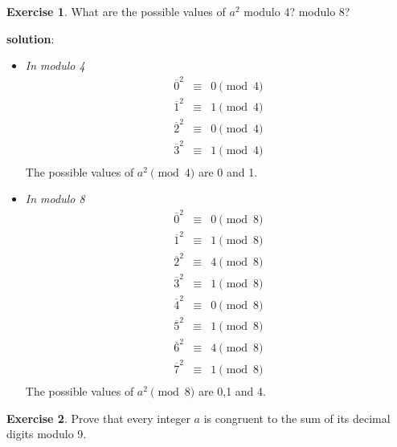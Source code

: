 \documentclass[
]{book}
\theoremstyle{definition}
\theoremstyle{definition}
\theoremstyle{definition}
\newtheorem{exercise}{Exercise}[chapter]
\theoremstyle{definition}
\theoremstyle{remark}
\begin{document}
\begin{exercise}
\protect\hypertarget{exr:unnamed-chunk-139}{}\label{exr:unnamed-chunk-139}What are the possible values of \(a^2\) modulo 4? modulo 8?
\end{exercise}

\textbf{solution}:

\begin{itemize}
\item
  \emph{In modulo 4}\\
  \begin{eqnarray*}
    \overline{0}^2&\equiv & 0 \pmod{4}\\
    \overline{1}^2&\equiv & 1 \pmod{4}\\
    \overline{2}^2&\equiv & 0 \pmod{4}\\
    \overline{3}^2&\equiv & 1 \pmod{4}\\
  \end{eqnarray*}
  The possible values of \(a^2\pmod{4}\) are 0 and 1.
\item
  \emph{In modulo 8}\\
  \begin{eqnarray*}
    \overline{0}^2&\equiv & 0 \pmod{8}\\
    \overline{1}^2&\equiv & 1 \pmod{8}\\
    \overline{2}^2&\equiv & 4 \pmod{8}\\
    \overline{3}^2&\equiv & 1 \pmod{8}\\
    \overline{4}^2&\equiv & 0 \pmod{8}\\
    \overline{5}^2&\equiv & 1 \pmod{8}\\
    \overline{6}^2&\equiv & 4 \pmod{8}\\
    \overline{7}^2&\equiv & 1 \pmod{8}\\
  \end{eqnarray*}
  The possible values of \(a^2\pmod{8}\) are 0,1 and 4.
\end{itemize}

\begin{exercise}
\protect\hypertarget{exr:unnamed-chunk-140}{}\label{exr:unnamed-chunk-140}Prove that every integer \(a\) is congruent to the sum of its decimal digits modulo 9.
\end{exercise}
\end{document}
